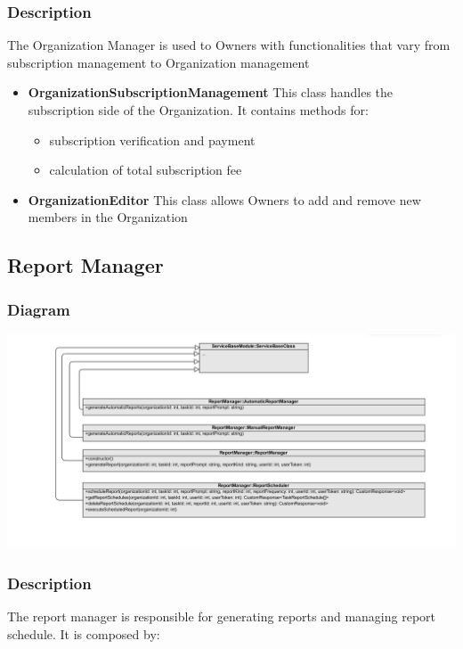 \documentclass{article}
\begin{document}
\subsubsection{Description}
The Organization Manager is used to Owners with functionalities that vary from subscription management to Organization management
\begin{itemize}
    \item \textbf{OrganizationSubscriptionManagement}
    This class handles the subscription side of the Organization. It contains methods for:
    \begin{itemize}
        \item subscription verification and payment
        \item calculation of total subscription fee
    \end{itemize}
    \item \textbf{OrganizationEditor}
    This class allows Owners to add and remove new members in the Organization

\end{itemize}
\subsection{Report Manager} %

\subsubsection{Diagram}

\includegraphics[width=\textwidth,height=\textheight,keepaspectratio]{images/class_diagram/reportManager.jpg}

\subsubsection{Description}

The report manager is responsible for generating reports and managing report schedule. It is composed by:
\end{document}
